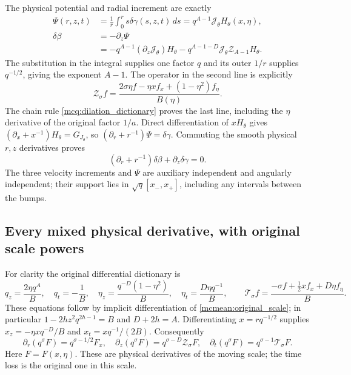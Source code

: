 \documentclass[11pt]{article}
\begin{document}
The physical potential and radial increment are exactly
\begin{equation}\label{mcmean:potential_radial}
\begin{split}
 \Psi(r,z,t)&=\frac1r\int_0^r s\delta\gamma(s,z,t)\,ds
             =q^{A-1}\mathcal J_\theta H_\theta(x,\eta),\\
 \delta\beta&=-\partial_z\Psi\\
 &=-q^{A-1}(\partial_z\mathcal J_\theta)H_\theta
   -q^{A-1-D}\mathcal J_\theta\mathcal Z_{A-1}H_\theta.
\end{split}
\end{equation}
The substitution in the integral supplies one factor \(q\) and its
outer \(1/r\) supplies \(q^{-1/2}\), giving the exponent \(A-1\).
The operator in the second line is explicitly
\[
 \mathcal Z_\sigma f
 =\frac{2\sigma\eta f-\eta x f_x+(1-\eta^2)f_\eta}{B(\eta)}.
\]
The chain rule \eqref{mcq:dilation_dictionary} proves the last line,
including the \(\eta\) derivative of the original factor \(1/a\).
Direct differentiation of \(xH_\theta\) gives
\((\partial_x+x^{-1})H_\theta=G_{J_\theta}\), so
\((\partial_r+r^{-1})\Psi=\delta\gamma\). Commuting the smooth
physical \(r,z\) derivatives proves
\begin{equation}\label{mcmean:divergence}
 (\partial_r+r^{-1})\delta\beta+\partial_z\delta\gamma=0.
\end{equation}
The three velocity increments and \(\Psi\) are auxiliary independent
and angularly independent; their support lies in
\(\sqrt q[x_-,x_+]\), including any intervals between the bumps.

\subsection{Every mixed physical derivative, with original scale powers}

For clarity the original differential dictionary is
\[
 q_z=\frac{2\eta q^A}{B},\quad q_t=-\frac1B,\quad
 \eta_z=\frac{q^{-D}(1-\eta^2)}B,\quad
 \eta_t=\frac{D\eta q^{-1}}B,
 \qquad
 \mathcal T_\sigma f=
 \frac{-\sigma f+\tfrac12x f_x+D\eta f_\eta}{B}.
\]
These equations follow by implicit differentiation of
\eqref{mcmean:original_scale}; in particular
\(1-2hz^2q^{2h-1}=B\) and \(D+2h=A\).
Differentiating \(x=rq^{-1/2}\) supplies
\(x_z=-\eta xq^{-D}/B\) and \(x_t=xq^{-1}/(2B)\).
Consequently
\[
 \partial_r(q^\sigma F)=q^{\sigma-1/2}F_x,\quad
 \partial_z(q^\sigma F)=q^{\sigma-D}\mathcal Z_\sigma F,\quad
 \partial_t(q^\sigma F)=q^{\sigma-1}\mathcal T_\sigma F.
\]
Here \(F=F(x,\eta)\). These are physical derivatives of the moving
scale; the time loss is the original one in this scale.
\end{document}
